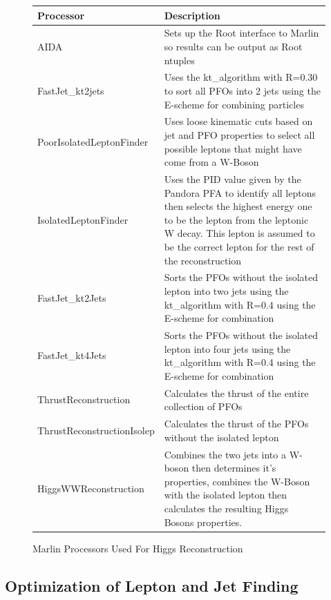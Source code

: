 \begin{figure}
  \centering
  \label{Fig:Marlin}
  \begin{tabular}{l p{}}
    \toprule
    Processor     &     Description          \\
    \midrule
    AIDA       &     Sets up the Root interface to Marlin so results can be output as Root ntuples      \\ 
    \midrule
    FastJet\_kt2jets     &  Uses the kt\_algorithm with R=0.30 to sort all PFOs into 2 jets using the E-scheme for combining particles \\
    \midrule
    PoorIsolatedLeptonFinder &    Uses loose kinematic cuts based on jet and PFO properties to select all possible leptons that might have come from a W-Boson \\
    \midrule
    IsolatedLeptonFinder &      Uses the PID value given by the Pandora PFA to identify all leptons then selects the highest energy one to be the lepton from the leptonic W decay. This lepton is assumed to be the correct lepton for the rest of the reconstruction \\
    \midrule
    FastJet\_kt2Jets &      Sorts the PFOs without the isolated lepton into two jets using the kt\_algorithm with R=0.4 using the E-scheme for combination\\
    \midrule
    FastJet\_kt4Jets &      Sorts the PFOs without the isolated lepton into four jets using the kt\_algorithm with R=0.4 using the E-scheme for combination \\
    \midrule
    ThrustReconstruction &  Calculates the thrust of the entire collection of PFOs   \\
    \midrule
    ThrustReconstructionIsolep &  Calculates the thrust of the PFOs without the isolated lepton    \\
    \midrule
    HiggsWWReconstruction & Combines the two jets into a W-boson then determines it's properties, combines the W-Boson with the isolated lepton then calculates the resulting Higgs Bosons properties.  \\
    \bottomrule
  \end{tabular}
  \caption[Marlin Processors Used For Higgs Reconstruction]{Marlin Processors Used For Higgs Reconstruction}
\end{figure}

\subsection{Optimization of Lepton and Jet Finding}

